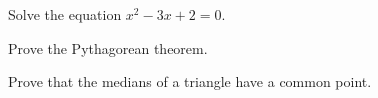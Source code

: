 \begin{schltask}
\item Solve the equation $x^2 - 3x + 2 = 0$.
\item Prove the Pythagorean theorem.
\item Prove that the medians of a triangle have a common point.
\end{schltask}